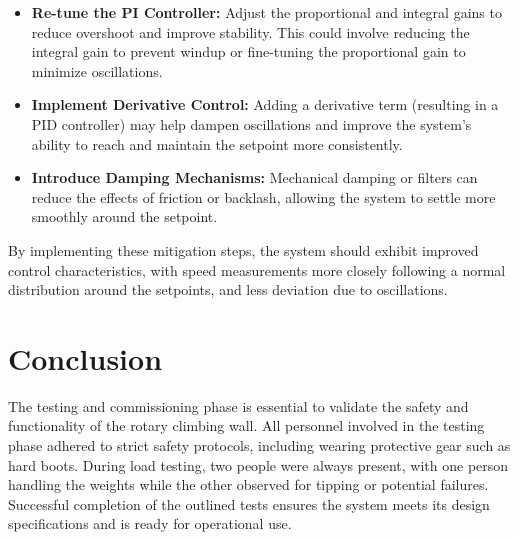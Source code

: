 \begin{itemize}
    \item \textbf{Re-tune the PI Controller:} Adjust the proportional and integral gains to reduce overshoot and improve stability. This could involve reducing the integral gain to prevent windup or fine-tuning the proportional gain to minimize oscillations.
    \item \textbf{Implement Derivative Control:} Adding a derivative term (resulting in a PID controller) may help dampen oscillations and improve the system's ability to reach and maintain the setpoint more consistently.
    \item \textbf{Introduce Damping Mechanisms:} Mechanical damping or filters can reduce the effects of friction or backlash, allowing the system to settle more smoothly around the setpoint.
\end{itemize}

By implementing these mitigation steps, the system should exhibit improved control characteristics, with speed measurements more closely following a normal distribution around the setpoints, and less deviation due to oscillations.




\section{Conclusion}
The testing and commissioning phase is essential to validate the safety and functionality of the rotary climbing wall. All personnel involved in the testing phase adhered to strict safety protocols, including wearing protective gear such as hard boots. During load testing, two people were always present, with one person handling the weights while the other observed for tipping or potential failures. Successful completion of the outlined tests ensures the system meets its design specifications and is ready for operational use.